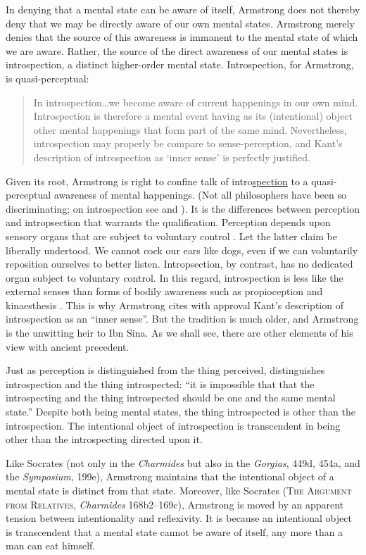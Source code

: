 In denying that a mental state can be aware of itself, Armstrong does not thereby deny that we may be directly aware of our own mental states. Armstrong merely denies that the source of this awareness is immanent to the mental state of which we are aware. Rather, the source of the direct awareness of our mental states is introspection, a distinct higher-order mental state. Introspection, for Armstrong, is quasi-perceptual:
\begin{quote}
	In introspection\ldots we become aware of current happenings in our own mind. Introspection is therefore a mental event having as its (intentional) object other mental happenings that form part of the same mind. Nevertheless, introspection may properly be compare to sense-perception, and Kant's description of introspection as `inner sense' is perfectly justified. \citep[323]{Armstrong:1968ns}
\end{quote}
Given its root, Armstrong is right to confine talk of intro\underline{spection} to a quasi-perceptual awareness of mental happenings. (Not all philosophers have been so discriminating; on introspection see \citealt{Lyons:1986fe} and \citealt{Spener:2024zh}). It is the differences between perception and intropsection that warrants the qualification. Perception depends upon sensory organs that are subject to voluntary control \citep[324]{Armstrong:1968ns}. Let the latter claim be liberally undertood. We cannot cock our ears like dogs, even if we can voluntarily reposition ourselves to better listen. Intropsection, by contrast, has no dedicated organ subject to voluntary control. In this regard, introspection is less like the external senses than forms of bodily awareness such as propioception and kinaesthesis \citep[324]{Armstrong:1968ns}. This is why Armstrong cites with approval Kant's description of introspection as an ``inner sense''. But the tradition is much older, and Armstrong is the unwitting heir to Ibn Sina. As we shall see, there are other elements of his view with ancient precedent.

Just as perception is distinguished from the thing perceived, \citet[324]{Armstrong:1968ns} distinguishes introspection and the thing introspected: ``it is impossible that that the introspecting and the thing introspected should be one and the same mental state.'' Despite both being mental states, the thing introspected is other than the introspection. The intentional object of introspection is transcendent in being other than the introspecting directed upon it.

Like Socrates (not only in the \emph{Charmides} but also in the \emph{Gorgias}, 449d, 454a, and the \emph{Symposium}, 199e), Armstrong maintains that the intentional object of a mental state is distinct from that state. Moreover, like Socrates (\textsc{The Argument from Relatives}, \emph{Charmides} 168b2–169c), Armstrong is moved by an apparent tension between intentionality and reflexivity. It is because an intentional object is transcendent that a mental state cannot be aware of itself, any more than a man can eat himself. 

